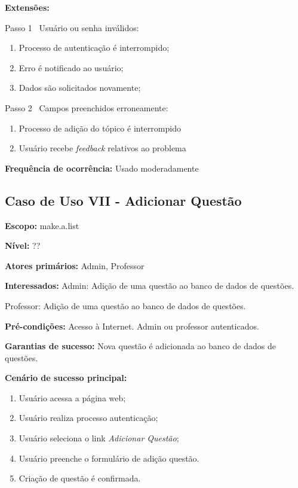 \documentclass[12pt,oneside,a4paper,article]{abntex2}
\begin{document}
		\textbf{Extensões:} 
		
		Passo 1 \textrightarrow \ Usuário ou senha inválidos:
		
		\begin{enumerate}[label=\alph*.]	
			\item Processo de autenticação é interrompido;
			\item Erro é notificado ao usuário;
			\item Dados são solicitados novamente;
		\end{enumerate}
		
		Passo 2 \textrightarrow \ Campos preenchidos erroneamente:
		
		\begin{enumerate}[label=\alph*.]	
			\item Processo de adição do tópico é interrompido
			\item Usuário recebe \textit{feedback} relativos ao problema	
		\end{enumerate}
		
		\textbf{Frequência de ocorrência:} Usado moderadamente
	
		\subsection{Caso de Uso VII - Adicionar Questão}
		
		\textbf{Escopo:} make.a.list 
		
		\textbf{Nível:} ??
		
		\textbf{Atores primários:} Admin, Professor
		
		\textbf{Interessados:} Admin: Adição de uma questão ao banco de dados de questões.
		
		Professor: Adição de uma questão ao banco de dados de questões.
		
		\textbf{Pré-condições:} Acesso à Internet. Admin ou professor autenticados.
		
		\textbf{Garantias de sucesso:} Nova questão é adicionada ao banco de dados de questões.
		
		\textbf{Cenário de sucesso principal:} 
		
		\begin{enumerate}
			\item Usuário acessa a página web;
			
			\item Usuário realiza processo autenticação;
			
			\item Usuário seleciona o link \textit{Adicionar Questão};
			
			\item Usuário preenche o formulário de adição questão.	
			
			\item Criação de questão é confirmada.
			
		\end{enumerate}
		
\end{document}
